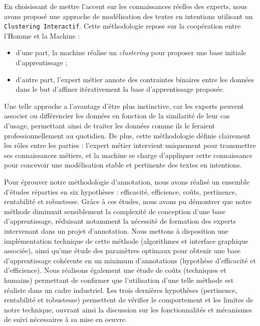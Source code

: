 		En choisissant de mettre l'accent sur les connaissances réelles des experts, nous avons proposé une approche de modélisation des textes en intentions utilisant un \texttt{Clustering Interactif}.
		Cette méthodologie repose sur la coopération entre l'Homme et la Machine :
		\begin{itemize}
			\item d'une part, la machine réalise un \textit{clustering} pour proposer une base initiale d'apprentissage ;
			\item d'autre part, l'expert métier annote des contraintes binaires entre les données dans le but d'affiner itérativement la base d'apprentissage proposée.
		\end{itemize}
		Une telle approche a l'avantage d'être plus instinctive, car les experts peuvent associer ou différencier les données en fonction de la similarité de leur cas d'usage, permettant ainsi de traiter les données comme ils le feraient professionnellement au quotidien.
		De plus, cette méthodologie définie clairement les rôles entre les parties : l'expert métier intervient uniquement pour transmettre ses connaissances métiers, et la machine se charge d'appliquer cette connaissance pour concevoir une modélisation stable et pertinente des textes en intentions.
		
		
		Pour éprouver notre méthodologie d'annotation, nous avons réalisé un ensemble d'études réparties en six hypothèses : efficacité, efficience, coûts, pertinence, rentabilité et robustesse.
		Grâce à ces études, nous avons pu démontrer que notre méthode diminuait sensiblement la complexité de conception d'une base d'apprentissage, réduisant notamment la nécessité de formation des experts intervenant dans un projet d'annotation.
		Nous mettons à disposition une implémentation technique de cette méthode (algorithmes et interface graphique associée), ainsi qu'une étude des paramètres optimaux pour obtenir une base d'apprentissage cohérente en un minimum d'annotations (hypothèse d'efficacité et d'efficience).
		Nous réalisons également une étude de coûts (techniques et humains) permettant de confirmer que l'utilisation d'une telle méthode est réaliste dans un cadre industriel.
		Les trois dernières hypothèses (pertinence, rentabilité et robustesse) permettent de vérifier le comportement et les limites de notre technique, ouvrant ainsi la discussion sur les fonctionnalités et mécanismes de suivi nécessaires à sa mise en oeuvre.
		
